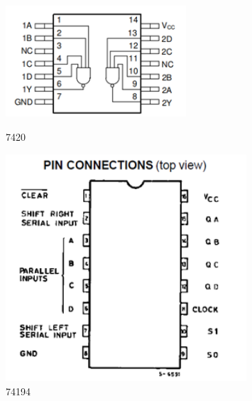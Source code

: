 \documentclass{ctexart}
\begin{document}
\begin{figure}[H]
    \centering
    \begin{minipage}{0.5\textwidth}
    \centering
           \includegraphics[width=0.6\textwidth]{7420.png}
           \caption{7420}
    \label{}
    \end{minipage}
    \hspace{0.05\textwidth}
    \begin{minipage}{0.3\textwidth}
    \centering
           \includegraphics[width=0.8\textwidth]{74194.png}
           \caption{74194}
    \label{}
    \end{minipage}
\end{figure}
\end{document}
